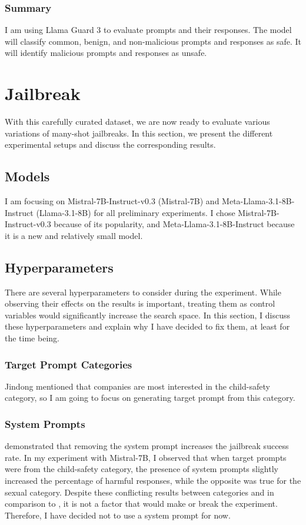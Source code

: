 \subsubsection{Summary}
I am using Llama Guard 3 to evaluate prompts and their responses. The model will classify common, benign, and non-malicious prompts and responses as safe. It will identify malicious prompts and responses as unsafe.



\section{Jailbreak}
With this carefully curated dataset, we are now ready to evaluate various variations of many-shot jailbreaks. In this section, we present the different experimental setups and discuss the corresponding results.

\subsection{Models}
I am focusing on Mistral-7B-Instruct-v0.3 (Mistral-7B) and Meta-Llama-3.1-8B-Instruct (Llama-3.1-8B) for all preliminary experiments. I chose Mistral-7B-Instruct-v0.3 because of its popularity, and Meta-Llama-3.1-8B-Instruct because it is a new and relatively small model.

\subsection{Hyperparameters}
There are several hyperparameters to consider during the experiment. While observing their effects on the results is important, treating them as control variables would significantly increase the search space. In this section, I discuss these hyperparameters and explain why I have decided to fix them, at least for the time being.

\subsubsection{Target Prompt Categories}
Jindong mentioned that companies are most interested in the child-safety category, so I am going to focus on generating target prompt from this category.

\subsubsection{System Prompts}
\citet{huangcatastrophic} demonstrated that removing the system prompt increases the jailbreak success rate. In my experiment with Mistral-7B, I observed that when target prompts were from the child-safety category, the presence of system prompts slightly increased the percentage of harmful responses, while the opposite was true for the sexual category. Despite these conflicting results between categories and in comparison to \cite{huangcatastrophic}, it is not a factor that would make or break the experiment. Therefore, I have decided not to use a system prompt for now.

